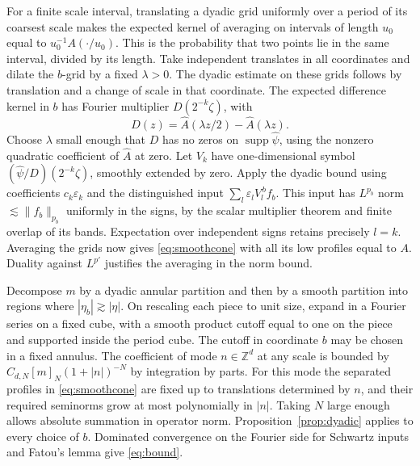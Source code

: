 \documentclass[11pt]{article}
\newcommand{\Z}{\mathbb Z}
\DeclareMathOperator{\supp}{supp}
\begin{document}
For a finite scale interval, translating a dyadic grid uniformly
over a period of its coarsest scale makes the expected kernel of
averaging on intervals of length \(u_0\) equal to
\(u_0^{-1}A(\cdot/u_0)\). This is the probability that two points
lie in the same interval, divided by its length. Take independent
translates in all coordinates and dilate the \(b\)-grid by a fixed
\(\lambda>0\). The dyadic estimate on these grids follows by
translation and a change of scale in that coordinate.
The expected difference kernel in \(b\) has Fourier multiplier
\(D(2^{-k}\zeta)\), with
\[
     D(z)=\widehat A(\lambda z/2)-\widehat A(\lambda z).
\]
Choose \(\lambda\) small enough that \(D\) has no zeros on
\(\supp\widehat\psi\), using the nonzero quadratic coefficient of
\(\widehat A\) at zero. Let \(V_k\) have one-dimensional symbol
\((\widehat\psi/D)(2^{-k}\zeta)\), smoothly extended by zero.
Apply the dyadic bound using coefficients \(c_k\varepsilon_k\)
and the distinguished input \(\sum_l\varepsilon_l V_l^{\,b}f_b\).
This input has \(L^{p_b}\) norm \(\lesssim\|f_b\|_{p_b}\)
uniformly in the signs, by the scalar multiplier theorem and
finite overlap of its bands. Expectation over independent signs
retains precisely \(l=k\). Averaging the grids now gives
\eqref{eq:smoothcone} with all its low profiles equal to \(A\).
Duality against \(L^{p'}\) justifies the averaging in the norm bound.

Decompose \(m\) by a dyadic annular partition and then by a smooth
partition into regions where \(|\eta_b|\gtrsim|\eta|\).
On rescaling each piece to unit size, expand in a Fourier series
on a fixed cube, with a smooth product cutoff equal to one on
the piece and supported inside the period cube. The cutoff in
coordinate \(b\) may be chosen in a fixed annulus. The coefficient
of mode \(n\in\Z^d\) at any scale is bounded by
\(C_{d,N}[m]_N(1+|n|)^{-N}\) by integration by parts. For this
mode the separated profiles in \eqref{eq:smoothcone} are fixed
up to translations determined by \(n\), and their required seminorms
grow at most polynomially in \(|n|\). Taking \(N\) large enough
allows absolute summation in operator norm. Proposition~\ref{prop:dyadic} applies to every choice of \(b\).
Dominated convergence on the Fourier side for Schwartz inputs
and Fatou's lemma give \eqref{eq:bound}.
\end{document}
